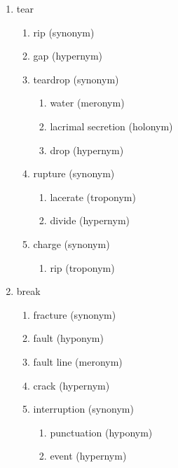 \documentclass[11pt,a4paper,twocolumn]{article}
\begin{document}
\begin{enumerate}
			\item tear
				\begin{enumerate}
					\item rip (synonym)
					
					\item gap (hypernym)
					
					\item teardrop (synonym)
						\begin{enumerate}
							\item water (meronym)
							
							\item lacrimal secretion (holonym)
							
							\item drop (hypernym)
						\end{enumerate}
						
					\item rupture (synonym)
						\begin{enumerate}
							\item lacerate (troponym)
							
							\item divide (hypernym)
						\end{enumerate}
						
					\item charge (synonym)
						\begin{enumerate}
							\item rip (troponym)
						\end{enumerate}
						
				\end{enumerate}
			
			\item break
				\begin{enumerate}
					\item fracture (synonym)
					
					\item fault (hyponym)
							
					\item fault line (meronym)
					
					\item crack (hypernym)
					
					\item interruption (synonym)
						\begin{enumerate}
							\item punctuation (hyponym)
							
							\item event (hypernym)
							

\end{enumerate}
\end{enumerate}
\end{enumerate}
\end{document}
